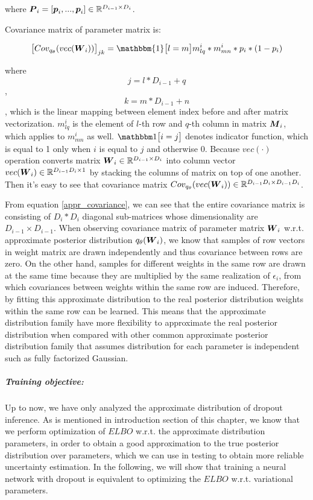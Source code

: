 where $\boldsymbol P_{i} = [\boldsymbol p_{i}, ..., \boldsymbol p_{i}] \in \mathbb R^{D_{i-1} \times D_{i}}$.

Covariance matrix of parameter matrix is:

\begin{equation}
\begin{aligned} \label{appr_covariance}
\big[Cov_{q_{\theta}}(vec(\bld W_{i}))\big]_{jk}   = \mathbbm{1} \big[l=m\big] m^{i}_{lq}*m^{i}_{mn}*p_{i}*(1-p_{i})
\end{aligned}
\end{equation}

where 
\[ j = l*D_{i-1} + q\],
\[ k = m*D_{i-1} + n\],
which is the linear mapping between element index before and after matrix vectorization. $m^{i}_{lq}$ is the element of $l$-th row and $q$-th column in matrix $\boldsymbol M_{i}$, which applies to $m^{i}_{mn}$ as well. $\mathbbm 1 \big[i=j\big]$ denotes indicator function, which is equal to 1 only when $i$ is equal to $j$ and otherwise 0. Because $vec(\cdot)$ operation converts matrix $\boldsymbol W_{i} \in \mathbb R^{D_{i-1} \times D_{i}}$ into column vector $ vec(\boldsymbol W_{i}) \in \mathbb R^{D_{i-1}D_{i} \times 1}$ by stacking the columns of matrix on top of one another. Then it's easy to see that covariance matrix $Cov_{q_{\theta}}(vec(\boldsymbol W_{i})) \in \mathbb R^{D_{i-1}D_{i} \times D_{i-1}D_{i}} $. 

From equation \ref{appr_covariance}, we can see that the entire covariance matrix is consisting of $D_{i} \ast D_{i}$ diagonal sub-matrices whose dimensionality are $D_{i-1} \times D_{i-1}$.
When observing covariance matrix of parameter matrix $\boldsymbol W_{i}$ w.r.t. approximate posterior distribution $q_{\theta}({\boldsymbol W_{i}})$, we know that samples of row vectors in weight matrix are drawn independently and thus covariance between rows are zero. On the other hand, samples for different weights in the same row are drawn at the same time because they are multiplied by the same realization of $\epsilon_{i}$, from which covariances between weights within the same row are induced. Therefore, by fitting this approximate distribution to the real posterior distribution weights within the same row can be learned. This means that the approximate distribution family have more flexibility to approximate the real posterior distribution when compared with other common approximate posterior distribution family that assumes distribution for each parameter is independent such as fully factorized Gaussian.


\subparagraph{Training objective:} Up to now, we have only analyzed the approximate distribution of dropout inference. As is mentioned in introduction section of this chapter, we know that we perform optimization of $ELBO$ w.r.t. the approximate distribution parameters, in order to obtain a good approximation to the true posterior distribution over parameters, which we can use in testing to obtain more reliable uncertainty estimation. In the following, we will show that training a neural network with dropout is equivalent to optimizing the $ELBO$ w.r.t. variational parameters.

